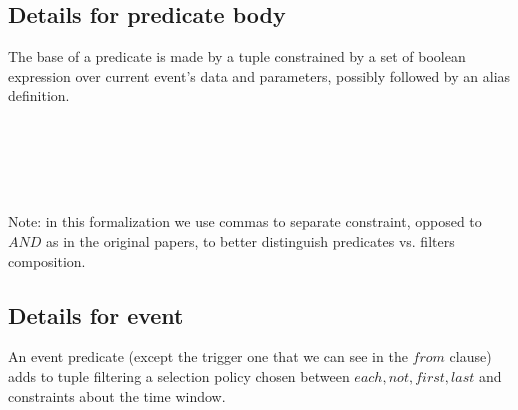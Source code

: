 \subsection{Details for predicate body}
The base of a predicate is made by a tuple constrained by a set of boolean expression over current event's data and parameters, possibly followed by an alias definition.
\begin{bnf*}
\\
\\
\\
\\
\end{bnf*}
Note: in this formalization we use commas to separate constraint, opposed to $AND$ as in the original papers, to better distinguish predicates vs. filters composition.

\subsection{Details for event}
An event predicate (except the trigger one that we can see in the $from$ clause) adds to tuple filtering a selection policy chosen between $each, not, first, last$ and constraints about the time window.
\begin{bnf*}
\\
\end{bnf*}

